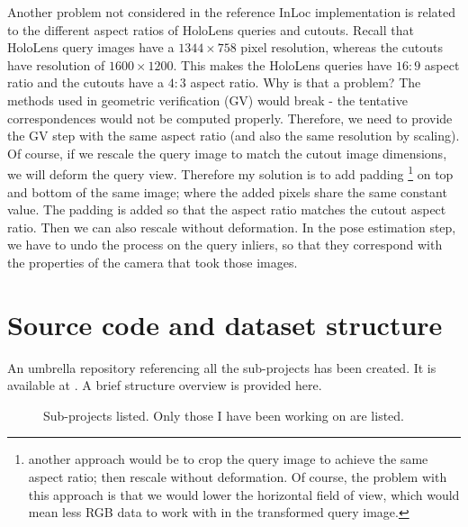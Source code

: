 \documentclass[twoside]{ctuthesis}
\theoremstyle{plain}
\theoremstyle{definition}
\theoremstyle{note}
\begin{document}
Another problem not considered in the reference InLoc implementation is related to the different aspect ratios of HoloLens queries and cutouts. Recall that HoloLens query images have a $1344 \times 758$ pixel resolution, whereas the cutouts have resolution of $1600 \times 1200$. This makes the HoloLens queries have $16:9$ aspect ratio and the cutouts have a $4:3$ aspect ratio. Why is that a problem? The methods used in geometric verification (GV) would break - the tentative correspondences would not be computed properly. Therefore, we need to provide the GV step with the same aspect ratio (and also the same resolution by scaling). Of course, if we rescale the query image to match the cutout image dimensions, we will deform the query view. Therefore my solution is to add padding \footnote{another approach would be to crop the query image to achieve the same aspect ratio; then rescale without deformation. Of course, the problem with this approach is that we would lower the horizontal field of view, which would mean less RGB data to work with in the transformed query image.} on top and bottom of the same image; where the added pixels share the same constant value. The padding is added so that the aspect ratio matches the cutout aspect ratio. Then we can also rescale without deformation. In the pose estimation step, we have to undo the process on the query inliers, so that they correspond with the properties of the camera that took those images.

\section{Source code and dataset structure}

An umbrella repository referencing all the sub-projects has been created. It is available at \cite{UmbrellaRepo}. A brief structure overview is provided here.

\begin{figure}[htb!]
	\centering
	\label{fig:all-subprojects-listed}
	\caption{Sub-projects listed. Only those I have been working on are listed.}
\end{figure}
\end{document}
